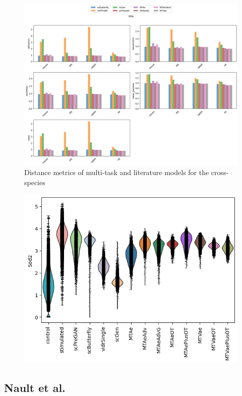 \documentclass[12pt, a4paper]{article}
\begin{document}
\begin{figure}[h!]
    \centering
    \includegraphics[width=.85\textwidth]{selected_benchmarking_cell_type_distance_metrics_cross_species.png}
    \caption{Distance metrics of multi-task and literature models for the cross-species}
    \label{}
\end{figure}

\begin{figure}[h!]
    \centering
    \includegraphics[width=.85\textwidth]{violins_cross_species.png}
    \caption{}
    \label{}
\end{figure}


\clearpage

\subsection{Nault et al.}
    
\end{document}
